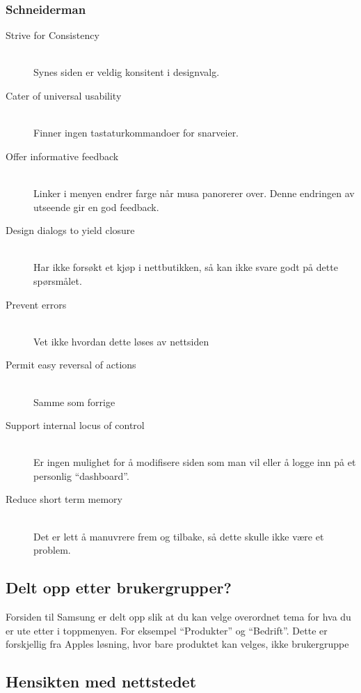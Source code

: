 \subsubsection{Schneiderman}

\begin{description}
  \item[Strive for Consistency] \hfill \\
    Synes siden er veldig konsitent i designvalg. 
  \item[Cater of universal usability] \hfill \\
    Finner ingen tastaturkommandoer for snarveier.
  \item[Offer informative feedback] \hfill \\
    Linker i menyen endrer farge når musa panorerer over. Denne endringen av utseende gir en god feedback. 
  \item[Design dialogs to yield closure] \hfill \\
    Har ikke forsøkt et kjøp i nettbutikken, så kan ikke svare godt på dette spørsmålet.
  \item[Prevent errors] \hfill \\
    Vet ikke hvordan dette løses av nettsiden
  \item[Permit easy reversal of actions] \hfill \\
    Samme som forrige 
  \item[Support internal locus of control] \hfill \\
    Er ingen mulighet for å modifisere siden som man vil eller å logge inn på et personlig ``dashboard''. 
  \item[Reduce short term memory] \hfill \\
    Det er lett å manuvrere frem og tilbake, så dette skulle ikke være et problem. 
\end{description}

\subsection{Delt opp etter brukergrupper?}

Forsiden til Samsung er delt opp slik at du kan velge overordnet tema for hva du er ute etter i toppmenyen. For eksempel ``Produkter'' og ``Bedrift''. Dette er forskjellig fra Apples løsning, hvor bare produktet kan velges, ikke brukergruppe 

\subsection{Hensikten med nettstedet}

